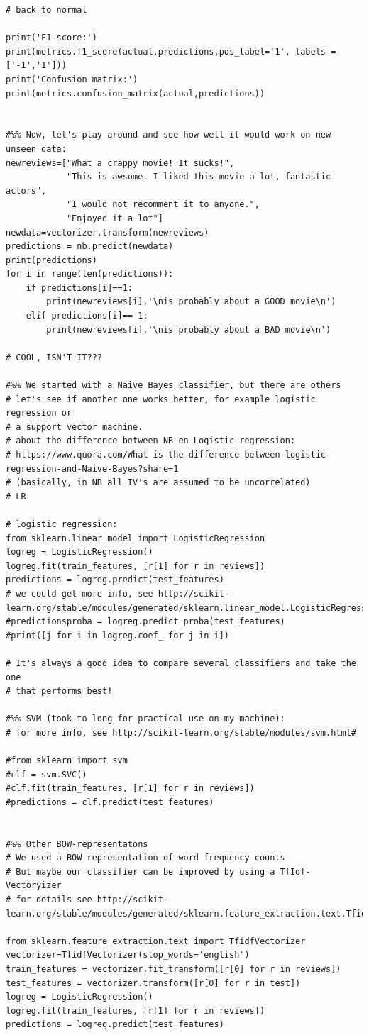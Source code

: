 \documentclass[a4paper,12pt]{book}
\begin{document}
\begin{lstlisting}
# back to normal

print('F1-score:')
print(metrics.f1_score(actual,predictions,pos_label='1', labels = ['-1','1']))
print('Confusion matrix:')
print(metrics.confusion_matrix(actual,predictions))


#%% Now, let's play around and see how well it would work on new unseen data:
newreviews=["What a crappy movie! It sucks!",
            "This is awsome. I liked this movie a lot, fantastic actors",
            "I would not recomment it to anyone.",
            "Enjoyed it a lot"]
newdata=vectorizer.transform(newreviews)
predictions = nb.predict(newdata)
print(predictions)
for i in range(len(predictions)):
    if predictions[i]==1:
        print(newreviews[i],'\nis probably about a GOOD movie\n')
    elif predictions[i]==-1:
        print(newreviews[i],'\nis probably about a BAD movie\n')

# COOL, ISN'T IT???
   
#%% We started with a Naive Bayes classifier, but there are others
# let's see if another one works better, for example logistic regression or 
# a support vector machine.
# about the difference between NB en Logistic regression:
# https://www.quora.com/What-is-the-difference-between-logistic-regression-and-Naive-Bayes?share=1
# (basically, in NB all IV's are assumed to be uncorrelated)
# LR 

# logistic regression:
from sklearn.linear_model import LogisticRegression
logreg = LogisticRegression()
logreg.fit(train_features, [r[1] for r in reviews])
predictions = logreg.predict(test_features)
# we could get more info, see http://scikit-learn.org/stable/modules/generated/sklearn.linear_model.LogisticRegression.html
#predictionsproba = logreg.predict_proba(test_features)
#print([j for i in logreg.coef_ for j in i])

# It's always a good idea to compare several classifiers and take the one
# that performs best!

#%% SVM (took to long for practical use on my machine):
# for more info, see http://scikit-learn.org/stable/modules/svm.html#

#from sklearn import svm
#clf = svm.SVC()
#clf.fit(train_features, [r[1] for r in reviews])
#predictions = clf.predict(test_features)


#%% Other BOW-representatons
# We used a BOW representation of word frequency counts
# But maybe our classifier can be improved by using a TfIdf-Vectoryizer
# for details see http://scikit-learn.org/stable/modules/generated/sklearn.feature_extraction.text.TfidfVectorizer.html

from sklearn.feature_extraction.text import TfidfVectorizer
vectorizer=TfidfVectorizer(stop_words='english')
train_features = vectorizer.fit_transform([r[0] for r in reviews])
test_features = vectorizer.transform([r[0] for r in test])
logreg = LogisticRegression()
logreg.fit(train_features, [r[1] for r in reviews])
predictions = logreg.predict(test_features)

\end{lstlisting}
\end{document}
